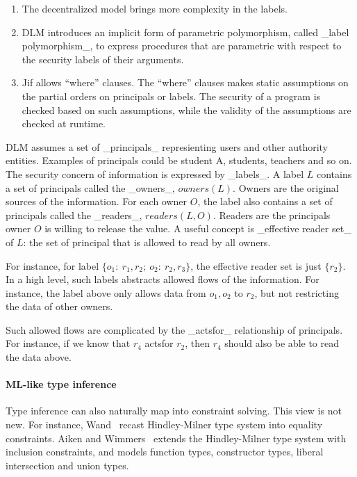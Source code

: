 \begin{enumerate}
\item The decentralized model brings more complexity in the labels.

\item DLM introduces an implicit form of parametric polymorphism, called _label
polymorphism_, to express procedures that are parametric with respect to the
security labels of their arguments.

\item Jif allows ``where'' clauses. The ``where'' clauses makes static
assumptions on the partial orders on principals or labels. The security of a
program is checked based on such assumptions, while the validity of the
assumptions are checked at runtime. 
\end{enumerate}

DLM assumes a set of _principals_ represienting users and other
authority entities. Examples of principals could be student A,
students, teachers and so on. The security concern of information is
expressed by _labels_. A label $L$ contains a set of principals called
the _owners_, $owners(L)$. Owners are the original sources of the
information. For each owner $O$, the label also contains a set of
principals called the _readers_, $readers(L,O)$. Readers are the
principals owner $O$ is willing to release the value. A useful concept
is _effective reader set_ of $L$: the set of principal that is allowed
to read by all owners.

For instance, for label $\{o_1:\ r_1,r_2;\ o_2:\ r_2,r_3\}$, the
effective reader set is just $\{r_2\}$. In a high level, such labels
abstracts allowed flows of the information. For instance, the label
above only allows data from $o_1, o_2$ to $r_2$, but not restricting
the data of other owners.

Such allowed flows are complicated by the _actsfor_ relationship of
principals. For instance, if we know that $r_4$ actsfor $r_2$, then
$r_4$ should also be able to read the data above.

\paragraph{ML-like type inference}

Type inference can also naturally map into constraint solving. This
view is not new. For instance, Wand~\cite{wand-typeinference} recast
Hindley-Milner type system into equality constraints. Aiken and
Wimmers~\cite{aiken-typeinclusion} extends the Hindley-Milner type
system with inclusion constraints, and models function types,
constructor types, liberal intersection and union types. 

